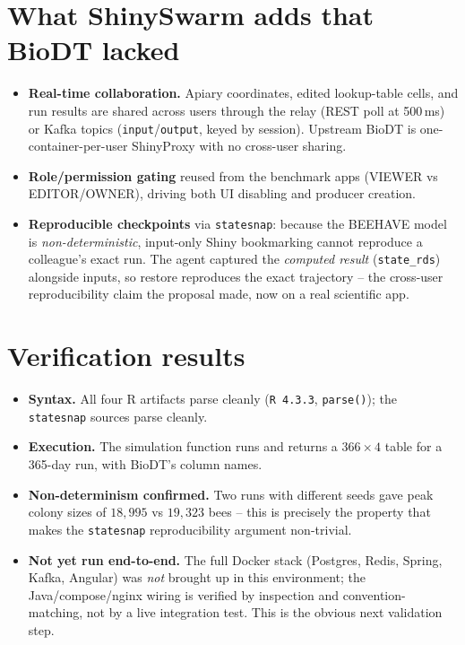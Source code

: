 \documentclass[12pt,a4paper]{article}
\begin{document}
\section{What ShinySwarm adds that BioDT lacked}

\begin{itemize}[nosep]
  \item \textbf{Real-time collaboration.} Apiary coordinates, edited lookup-table
    cells, and run results are shared across users through the relay (REST poll
    at 500\,ms) or Kafka topics (\texttt{input}/\texttt{output}, keyed by
    session). Upstream BioDT is one-container-per-user ShinyProxy with no
    cross-user sharing.
  \item \textbf{Role/permission gating} reused from the benchmark apps
    (VIEWER vs EDITOR/OWNER), driving both UI disabling and producer creation.
  \item \textbf{Reproducible checkpoints} via \texttt{statesnap}: because the
    BEEHAVE model is \emph{non-deterministic}, input-only Shiny bookmarking
    cannot reproduce a colleague's exact run. The agent captured the
    \emph{computed result} (\texttt{state\_rds}) alongside inputs, so restore
    reproduces the exact trajectory -- the cross-user reproducibility claim the
    proposal made, now on a real scientific app.
\end{itemize}

\section{Verification results}

\begin{itemize}[nosep]
  \item \textbf{Syntax.} All four R artifacts parse cleanly (\texttt{R 4.3.3},
    \texttt{parse()}); the \texttt{statesnap} sources parse cleanly.
  \item \textbf{Execution.} The simulation function runs and returns a
    $366\times4$ table for a 365-day run, with BioDT's column names.
  \item \textbf{Non-determinism confirmed.} Two runs with different seeds gave
    peak colony sizes of $18{,}995$ vs $19{,}323$ bees -- this is precisely the
    property that makes the \texttt{statesnap} reproducibility argument non-trivial.
  \item \textbf{Not yet run end-to-end.} The full Docker stack (Postgres, Redis,
    Spring, Kafka, Angular) was \emph{not} brought up in this environment; the
    Java/compose/nginx wiring is verified by inspection and convention-matching,
    not by a live integration test. This is the obvious next validation step.
\end{itemize}
\end{document}
